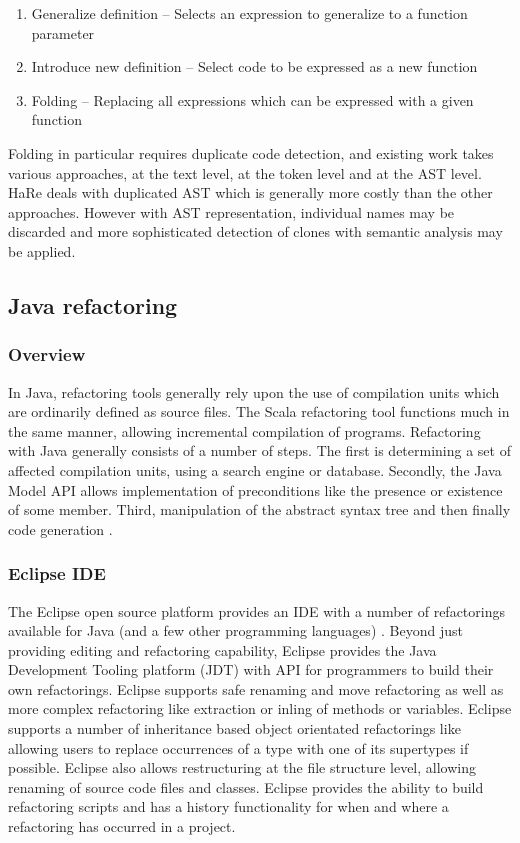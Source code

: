 \begin{enumerate}
\item Generalize definition -- Selects an expression to generalize to a function parameter
\item Introduce new definition -- Select code to be expressed as a new function
\item Folding -- Replacing all expressions which can be expressed with a given function
\end{enumerate}

Folding in particular requires duplicate code detection, and existing work takes various approaches, at the text level, at the token level and at the AST level. HaRe deals with duplicated AST which is generally more costly than the other approaches. However with AST representation, individual names may be discarded and more sophisticated detection of clones with semantic analysis may be applied. 

\subsection{Java refactoring}
\subsubsection{Overview}
In Java, refactoring tools generally rely upon the use of compilation units which are ordinarily defined as source files. The Scala refactoring tool functions much in the same manner, allowing incremental compilation of programs. Refactoring with Java generally consists of a number of steps. The first is determining a set of affected compilation units, using a search engine or database. Secondly, the Java Model API allows implementation of preconditions like the presence or existence of some member. Third, manipulation of the abstract syntax tree and then finally code generation \cite{baumer2001integrating}. 

\subsubsection{Eclipse IDE}
The Eclipse open source platform provides an IDE with a number of refactorings available for Java (and a few other programming languages) \cite{widmer07}. Beyond just providing editing and refactoring capability, Eclipse provides the Java Development Tooling platform (JDT) with API for programmers to build their own refactorings. Eclipse supports safe renaming and move refactoring as well as more complex refactoring like extraction or inling of methods or variables. Eclipse supports a number of inheritance based object orientated refactorings like allowing users to replace occurrences of a type with one of its supertypes if possible. Eclipse also allows restructuring at the file structure level, allowing renaming of source code files and classes. Eclipse provides the ability to build refactoring scripts and has a history functionality for when and where a refactoring has occurred in a project. 

